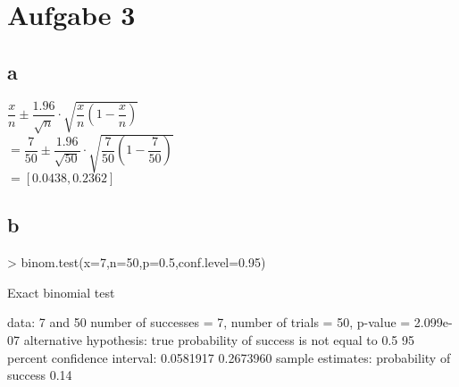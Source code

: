 

\section{Aufgabe 3}

\subsection{a}
$\dfrac{x}{n} \pm \dfrac{1.96}{\sqrt{n}} 
\cdot \sqrt{\dfrac{x}{n} \left(1 - \dfrac{x}{n}\right)}$\\
$= \dfrac{7}{50} \pm \dfrac{1.96}{\sqrt{50}} 
\cdot \sqrt{\dfrac{7}{50} \left(1 - \dfrac{7}{50}\right)}$\\
$ = [0.0438, 0.2362]$

\subsection{b}
\begin{Schunk}
\begin{Sinput}
> binom.test(x=7,n=50,p=0.5,conf.level=0.95)
\end{Sinput}
\begin{Soutput}
	Exact binomial test

data:  7 and 50 
number of successes = 7, number of trials = 50, p-value = 2.099e-07
alternative hypothesis: true probability of success is not equal to 0.5 
95 percent confidence interval:
 0.0581917 0.2673960 
sample estimates:
probability of success 
                  0.14 
\end{Soutput}
\end{Schunk}
